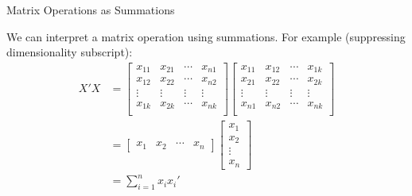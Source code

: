 \begin{frame}{Matrix Operations as Summations}

    We can interpret a matrix operation using summations. For example (suppressing dimensionality subscript):
    \begin{align*}
        X' X &= \begin{bmatrix} 
                    x_{11} & x_{21} & \cdots & x_{n1} \\
                    x_{12} & x_{22} & \cdots & x_{n2} \\
                    \vdots & \vdots & \vdots & \vdots \\
                    x_{1k} & x_{2k} & \cdots & x_{nk} \\
                    \end{bmatrix}
                    \begin{bmatrix} 
                    x_{11} & x_{12} & \cdots & x_{1k} \\
                    x_{21} & x_{22} & \cdots & x_{2k} \\
                    \vdots & \vdots & \vdots & \vdots \\
                    x_{n1} & x_{n2} & \cdots & x_{nk} \\
                    \end{bmatrix}
        \\
        &= \begin{bmatrix} 
            x_1 & x_2 & \cdots & x_n
            \end{bmatrix}
            \begin{bmatrix} 
            x_1 \\ x_2 \\ \vdots \\ x_n
            \end{bmatrix}
        \\
        &= \sum_{i=1}^n x_i x_i'
    \end{align*}
    
\end{frame}

